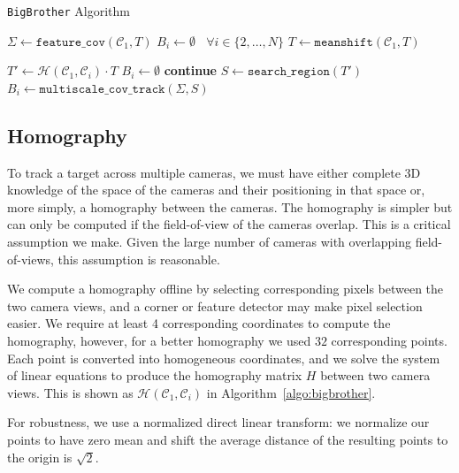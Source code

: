 \documentclass{article}
\begin{document}
\begin{algorithm}
\caption{\texttt{BigBrother} Algorithm}\label{algo:bigbrother}
\begin{algorithmic}[1]
\State $\Sigma\gets \mathtt{feature\_cov}(\mathcal{C}_1, T)$
\State $B_i\gets\emptyset~~~~\forall i\in\{2,\dots,N\}$
    \State $T\gets \mathtt{meanshift}(\mathcal{C}_1, T)$

        \State $T'\gets \mathcal{H}(\mathcal{C}_1, \mathcal{C}_i)\cdot T$
            \State $B_i\gets\emptyset$
            \State \textbf{continue}
        \EndIf
        \State $S\gets\mathtt{search\_region}(T')$
        \State $B_i\gets\mathtt{multiscale\_cov\_track}(\Sigma, S)$
    \EndFor
\EndWhile
\EndProcedure
\end{algorithmic}
\end{algorithm}

\subsection{Homography}
\label{sec:homography}
To track a target across multiple cameras, we must have either complete 3D knowledge of the space of the cameras and their positioning in that space or, more simply, a homography between the cameras. The homography is simpler but can only be computed if the field-of-view of the cameras overlap. This is a critical assumption we make. Given the large number of cameras with overlapping field-of-views, this assumption is reasonable.

We compute a homography offline by selecting corresponding pixels between the two camera views, and a corner or feature detector may make pixel selection easier. We require at least 4 corresponding coordinates to compute the homography, however, for a better homography we used $32$ corresponding points. Each point is converted into homogeneous coordinates, and we solve the system of linear equations to produce the homography matrix $H$ between two camera views. This is shown as $\mathcal{H}(\mathcal{C}_1, \mathcal{C}_i)$ in Algorithm~\ref{algo:bigbrother}.

For robustness, we use a normalized direct linear transform: we normalize our points to have zero mean and shift the average distance of the resulting points to the origin is $\sqrt{2}$.
\end{document}
